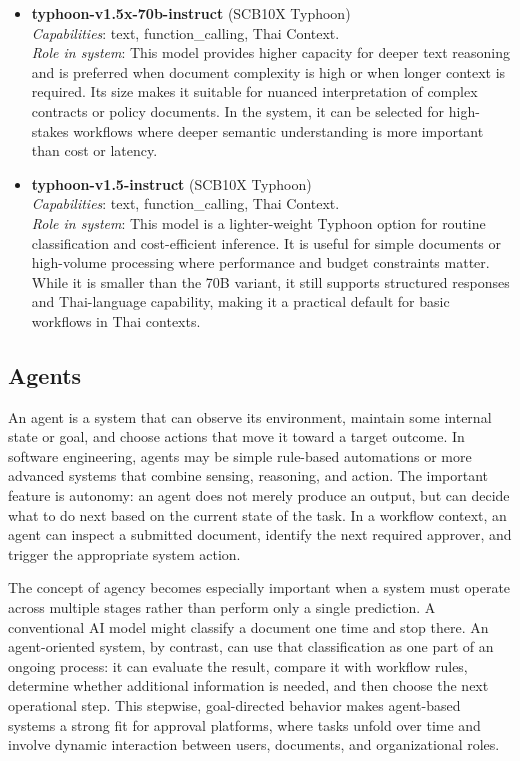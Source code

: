 \documentclass[12pt,oneside,openright,a4paper]{cpe-english-project}
\begin{document}
\begin{itemize}
  \item \textbf{typhoon-v1.5x-70b-instruct} (SCB10X Typhoon) \\
  \emph{Capabilities}: text, function\_calling, Thai Context. \\
  \emph{Role in system}: This model provides higher capacity for deeper
  text reasoning and is preferred when document complexity is high or
  when longer context is required. Its size makes it suitable for
  nuanced interpretation of complex contracts or policy documents. In
  the system, it can be selected for high-stakes workflows where deeper
  semantic understanding is more important than cost or latency.

  \item \textbf{typhoon-v1.5-instruct} (SCB10X Typhoon) \\
  \emph{Capabilities}: text, function\_calling, Thai Context. \\
  \emph{Role in system}: This model is a lighter-weight Typhoon option
  for routine classification and cost-efficient inference. It is useful
  for simple documents or high-volume processing where performance and
  budget constraints matter. While it is smaller than the 70B variant,
  it still supports structured responses and Thai-language capability,
  making it a practical default for basic workflows in Thai contexts.
\end{itemize}

\vspace{1em}

\subsection{Agents}

An agent is a system that can observe its environment, maintain some
internal state or goal, and choose actions that move it toward a target
outcome. In software engineering, agents may be simple rule-based
automations or more advanced systems that combine sensing, reasoning,
and action. The important feature is autonomy: an agent does not merely
produce an output, but can decide what to do next based on the current
state of the task. In a workflow context, an agent can inspect a
submitted document, identify the next required approver, and trigger the
appropriate system action.

The concept of agency becomes especially important when a system must
operate across multiple stages rather than perform only a single
prediction. A conventional AI model might classify a document one time
and stop there. An agent-oriented system, by contrast, can use that
classification as one part of an ongoing process: it can evaluate the
result, compare it with workflow rules, determine whether additional
information is needed, and then choose the next operational step. This
stepwise, goal-directed behavior makes agent-based systems a strong fit
for approval platforms, where tasks unfold over time and involve dynamic
interaction between users, documents, and organizational roles.
\end{document}

